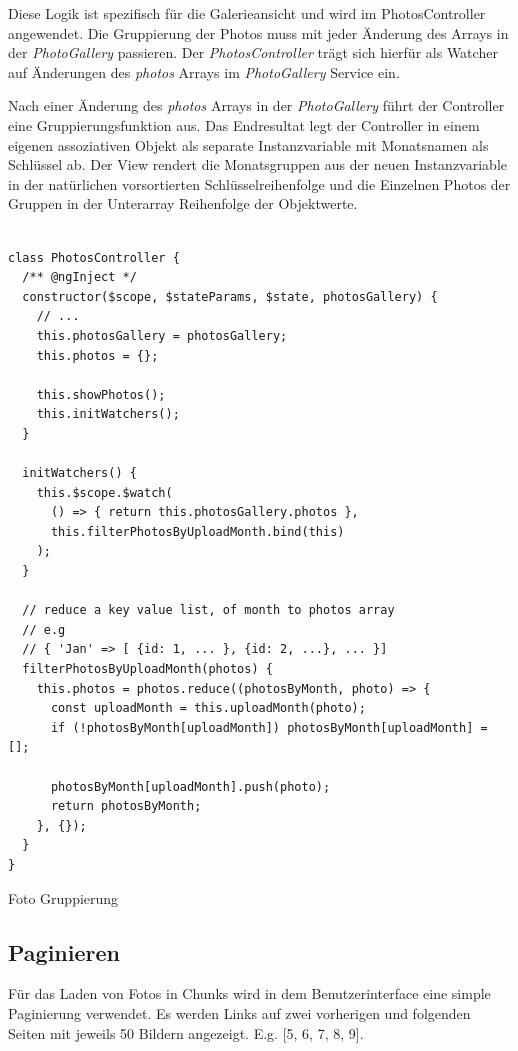 Diese Logik ist spezifisch für die Galerieansicht und wird im PhotosController angewendet. Die Gruppierung der Photos muss mit jeder Änderung des Arrays in der \textit{PhotoGallery} passieren. Der \textit{PhotosController} trägt sich hierfür als Watcher auf Änderungen des \textit{photos} Arrays im \textit{PhotoGallery} Service ein.

Nach einer Änderung des \textit{photos} Arrays in der \textit{PhotoGallery} führt der Controller eine Gruppierungsfunktion aus. Das Endresultat legt der Controller in einem eigenen assoziativen Objekt als separate Instanzvariable mit Monatsnamen als Schlüssel ab. Der View rendert die Monatsgruppen aus der neuen Instanzvariable in der natürlichen vorsortierten Schlüsselreihenfolge und die Einzelnen Photos der Gruppen in der Unterarray Reihenfolge der Objektwerte.

\begin{listing}[H]
\begin{verbatim}

class PhotosController {
  /** @ngInject */
  constructor($scope, $stateParams, $state, photosGallery) {
    // ...
    this.photosGallery = photosGallery;
    this.photos = {};

    this.showPhotos();
    this.initWatchers();
  }

  initWatchers() {
    this.$scope.$watch(
      () => { return this.photosGallery.photos },
      this.filterPhotosByUploadMonth.bind(this)
    );
  }

  // reduce a key value list, of month to photos array
  // e.g
  // { 'Jan' => [ {id: 1, ... }, {id: 2, ...}, ... }]
  filterPhotosByUploadMonth(photos) {
    this.photos = photos.reduce((photosByMonth, photo) => {
      const uploadMonth = this.uploadMonth(photo);
      if (!photosByMonth[uploadMonth]) photosByMonth[uploadMonth] = [];

      photosByMonth[uploadMonth].push(photo);
      return photosByMonth;
    }, {});
  }
}

\end{verbatim}
\caption{Foto Gruppierung}
\label{lst:photo_group}
\end{listing}

\subsection{Paginieren}

Für das Laden von Fotos in Chunks wird in dem Benutzerinterface eine simple Paginierung verwendet. Es werden Links auf zwei vorherigen und folgenden Seiten mit jeweils 50 Bildern angezeigt. E.g. [5, 6, 7, 8, 9].

